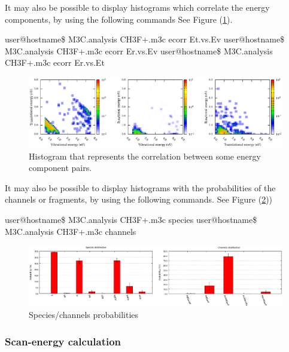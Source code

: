 \documentclass[a4paper,12pt]{article}
\begin{document}
It may also be possible to display histograms which correlate the energy components, by using the following commands
See Figure (\ref{fig: ecorr energy}).

\begin{shellexec}
user@hostname\$ M3C.analysis CH3F+.m3c ecorr Et.vs.Ev
user@hostname\$ M3C.analysis CH3F+.m3c ecorr Er.vs.Ev
user@hostname\$ M3C.analysis CH3F+.m3c ecorr Er.vs.Et
\end{shellexec}

\begin{figure}[h]
\centering
\includegraphics[scale=0.55]{images/ecorrEnergy.eps}
\caption{\footnotesize{
Histogram that represents the correlation between some energy component pairs.
}}
\label{fig: ecorr energy}
\end{figure}
It may also be possible to display histograms with the probabilities of the channels or fragments, by using the following commands. 
See Figure (\ref{fig: histogram species and fragments}))

\begin{shellexec}
user@hostname\$ M3C.analysis CH3F+.m3c species
user@hostname\$ M3C.analysis CH3F+.m3c channels
\end{shellexec}

\begin{figure}[h]
\centering
\includegraphics[scale=0.5]{images/speciesFragmentsHistogram.eps}
\caption{\footnotesize{
Species/channels probabilities
}}
\label{fig: histogram species and fragments}
\end{figure}

\subsubsection{Scan-energy calculation}
\end{document}
